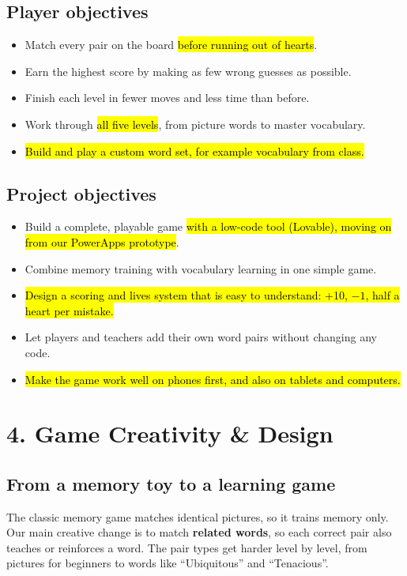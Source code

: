 \documentclass[11pt,a4paper]{article}
\begin{document}
\subsection*{Player objectives}
\begin{itemize}
  \item Match every pair on the board \hl{before running out of hearts}.
  \item Earn the highest score by making as few wrong guesses as possible.
  \item Finish each level in fewer moves and less time than before.
  \item Work through \hl{all five levels}, from picture words to master vocabulary.
  \item \hl{Build and play a custom word set, for example vocabulary from class.}
\end{itemize}

\subsection*{Project objectives}
\begin{itemize}
  \item Build a complete, playable game \hl{with a low-code tool (Lovable), moving on from our PowerApps prototype}.
  \item Combine memory training with vocabulary learning in one simple game.
  \item \hl{Design a scoring and lives system that is easy to understand: +10, {$-1$}, half a heart per mistake.}
  \item Let players and teachers add their own word pairs without changing any code.
  \item \hl{Make the game work well on phones first, and also on tablets and computers.}
\end{itemize}

\section{4. Game Creativity \& Design}
\subsection*{From a memory toy to a learning game}
The classic memory game matches identical pictures, so it trains memory only. Our main creative change is to match \textbf{related words}, so each correct pair also teaches or reinforces a word. The pair types get harder level by level, from pictures for beginners to words like ``Ubiquitous'' and ``Tenacious''.
\end{document}
